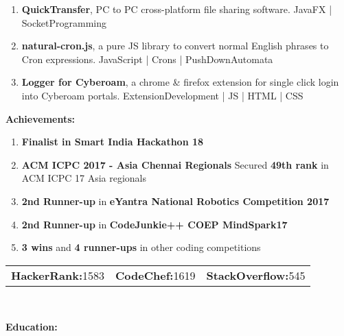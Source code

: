 \documentclass[a4paper,11pt]{article}
\begin{document}
\begin{center}
\begin{minipage}[t]{0.6\textwidth}
\begin{LARGE}
{\begin{enumerate}
						DJango | Python | MachineLearning | WebDevelopment
						\item \textbf{QuickTransfer}, PC to PC cross-platform file sharing software.\linebreak
						JavaFX | SocketProgramming
						\item \textbf{natural-cron.js}, a pure JS library to convert normal English phrases to Cron expressions.\linebreak
						JavaScript | Crons | PushDownAutomata
						\item \textbf{Logger for Cyberoam}, a chrome \& firefox extension for single click login into Cyberoam portals.\linebreak
						ExtensionDevelopment | JS | HTML | CSS
					\end{enumerate}
				}
			\end{LARGE}
			\vspace{0.65cm}
            \begin{LARGE}
				\textbf{Achievements:}\medskip%
				{\small
					\begin{enumerate}
						\item \textbf{Finalist in Smart India Hackathon 18}
						\item \textbf{ACM ICPC 2017 - Asia Chennai Regionals}\linebreak
						Secured \textbf{49th rank} in ACM ICPC 17 Asia regionals
						\item \textbf{2nd Runner-up} in \textbf{eYantra National Robotics Competition 2017}
						\item \textbf{2nd Runner-up} in \textbf{CodeJunkie++ COEP MindSpark17}
						\item \textbf{3 wins} and \textbf{4 runner-ups} in other coding competitions
					\end{enumerate}
				}
			\end{LARGE}
			\vspace{0.35cm}
			\begin{normalsize}
				\begin{tabu} to \textwidth {X[l]X[c]X[r]}
					\textbf{HackerRank:}1583 & \textbf{CodeChef:}1619 & \textbf{StackOverflow:}545
				\end{tabu}
			\end{normalsize}
			\\
			\vspace{0.7cm}
            \begin{LARGE}
				\textbf{Education:}
				\medskip\linebreak%

\end{LARGE}
\end{minipage}
\end{center}
\end{document}
